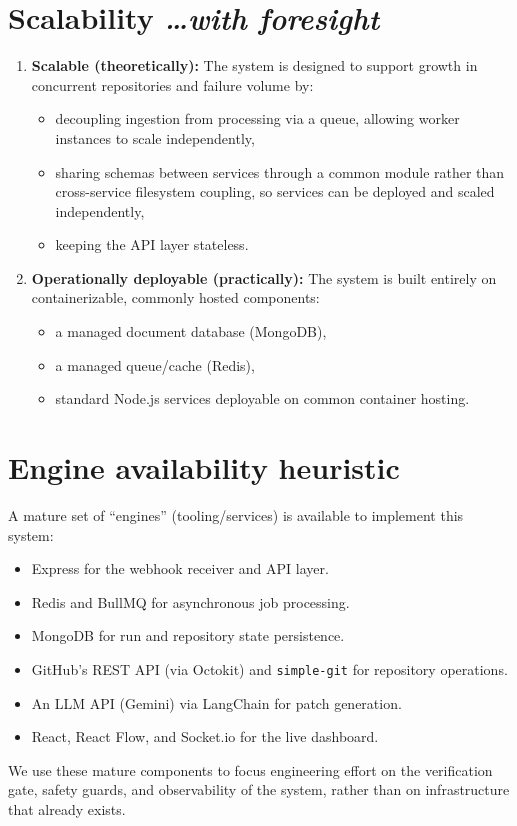 \documentclass[11pt,a4paper]{article}
\newcommand{\BvrHint}[1]{%
  {\normalfont\normalsize\itshape\hfill #1}}
\begin{document}
\section{Scalability %
\BvrHint{\ldots with foresight}}
\begin{enumerate}[leftmargin=0.7cm]
    \item \textbf{Scalable (theoretically):} The system is designed
      to support growth in concurrent repositories and failure
      volume by:
    \begin{itemize}[leftmargin=0.7cm]
        \item decoupling ingestion from processing via a queue,
          allowing worker instances to scale independently,
        \item sharing schemas between services through a common
          module rather than cross-service filesystem coupling, so
          services can be deployed and scaled independently,
        \item keeping the API layer stateless.
    \end{itemize}
    
    \item \textbf{Operationally deployable (practically):} The
      system is built entirely on containerizable, commonly hosted
      components:
    \begin{itemize}[leftmargin=0.7cm]
        \item a managed document database (MongoDB),
        \item a managed queue/cache (Redis),
        \item standard Node.js services deployable on common
          container hosting.
    \end{itemize}
\end{enumerate}

\section{Engine availability heuristic}
A mature set of ``engines'' (tooling/services) is available to
implement this system:
\begin{itemize}[leftmargin=0.7cm]
    \item Express for the webhook receiver and API layer.
    \item Redis and BullMQ for asynchronous job processing.
    \item MongoDB for run and repository state persistence.
    \item GitHub's REST API (via Octokit) and \texttt{simple-git}
      for repository operations.
    \item An LLM API (Gemini) via LangChain for patch generation.
    \item React, React Flow, and Socket.io for the live dashboard.
\end{itemize}
We use these mature components to focus engineering effort on the
verification gate, safety guards, and observability of the system,
rather than on infrastructure that already exists.
\end{document}
